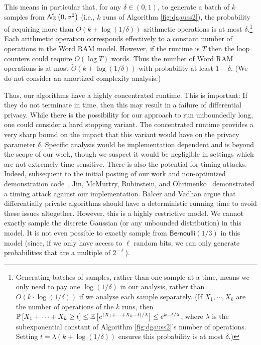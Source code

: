 \documentclass{jpcfinal} %
\newcommand{\dgausss}[2]{{\discN\left(#1,#2\right)}}
\newcommand{\dgauss}[1]{\dgausss{0}{#1}}
\newcommand{\ex}[2]{{\ifx&#1& \mathbb{E} \else
\underset{#1}{\mathbb{E}} \fi \left[#2\right]}}
\newcommand{\pr}[2]{{\ifx&#1& \mathbb{P} \else
\underset{#1}{\mathbb{P}} \fi \left[#2\right]}}
\newcommand{\bern}{\mathsf{Bernoulli}}
\begin{document}
This means in particular that, for any $\delta \in (0,1)$, to generate a batch of $k$ samples from $\dgauss{\sigma^2}$ (i.e., $k$ runs of Algorithm \ref{fig:dgauss2}), the probability of requiring more than $O(k + \log(1/\delta))$ arithmetic operations is at most $\delta$.\footnote{Generating batches of samples, rather than one sample at a time, means we only need to pay one $\log(1/\delta)$ in our analysis, rather than $O(k \cdot \log(1/\delta))$ if we analyse each sample separately. (If $X_1,\cdots,X_k$ are the number of operations of the $k$ runs, then $\pr{}{X_1 + \cdots + X_k \ge t} \le \ex{}{e^{(X_1 + \cdots + X_k-t)/\lambda}} \le e^{k-t/\lambda}$, where $\lambda$ is the subexponential constant of Algorithm \ref{fig:dgauss2}'s number of operations. Setting $t=\lambda(k+\log(1/\delta))$ ensures this probability is at most $\delta$.)} Each arithmetic operation corresponds effectively to a constant number of operations in the Word RAM model. However, if the runtime is $T$ then the loop counters could require $O(\log T)$ words. Thus the number of Word RAM operations is at most $\tilde{O}(k + \log(1/\delta))$ with probability at least $1-\delta$. (We do not consider an amortized complexity analysis.)

Thus, our algorithms have a highly concentrated runtime. This is important: If they do not terminate in time, then this may result in a failure of differential privacy. 
While there is the possibility for our approach to run unboundedly long, one could consider a hard stopping variant.
The concentrated runtime provides a very sharp bound on the impact that this variant would have on the privacy parameter $\delta$.
Specific analysis would be implementation dependent and is beyond the scope of our work, though we suspect it would be negligible in settings which are not extremely time-sensitive.
There is also the potential for timing attacks.
Indeed, subsequent to the initial posting of our work and non-optimized demonstration code~\cite{CKS20,DGaussGithub}, Jin, McMurtry, Rubinstein, and Ohrimenko~\cite{JinMRO21} demonstrated a timing attack against our implementation. 
Balcer and Vadhan \cite{BalcerV17} argue that differentially private algorithms should have a deterministic running time to avoid these issues altogether. However, this is a highly restrictive model. We cannot exactly sample the discrete Gaussian (or any unbounded distribution) in this model. It is not even possible to exactly sample from $\bern(1/3)$ in this model (since, if we only have access to $\ell$ random bits, we can only generate probabilities that are a multiple of $2^{-\ell}$). 
\end{document}
